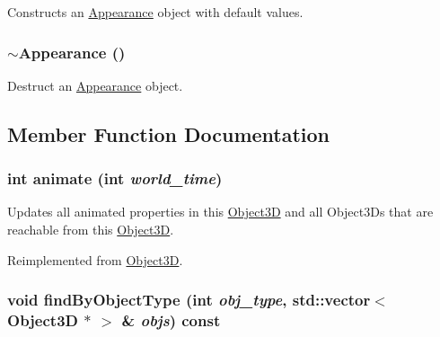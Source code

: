 Constructs an \hyperlink{classm3g_1_1Appearance}{Appearance} object with default values. \hypertarget{classm3g_1_1Appearance_c05c93d7a0f286cb9471b6c667ffeee1}{
\subsubsection[{$\sim$Appearance}]{\setlength{\rightskip}{0pt plus 5cm}$\sim${\bf Appearance} ()}}
\label{classm3g_1_1Appearance_c05c93d7a0f286cb9471b6c667ffeee1}


Destruct an \hyperlink{classm3g_1_1Appearance}{Appearance} object. 

\subsection{Member Function Documentation}
\hypertarget{classm3g_1_1Appearance_8aad1ceab4c2a03609c8a42324ce484d}{
\subsubsection[{animate}]{\setlength{\rightskip}{0pt plus 5cm}int animate (int {\em world\_\-time})}}
\label{classm3g_1_1Appearance_8aad1ceab4c2a03609c8a42324ce484d}


Updates all animated properties in this \hyperlink{classm3g_1_1Object3D}{Object3D} and all Object3Ds that are reachable from this \hyperlink{classm3g_1_1Object3D}{Object3D}. 

Reimplemented from \hyperlink{classm3g_1_1Object3D_8aad1ceab4c2a03609c8a42324ce484d}{Object3D}.\hypertarget{classm3g_1_1Appearance_4dadb21b568b0230fac106f15040138c}{
\subsubsection[{findByObjectType}]{\setlength{\rightskip}{0pt plus 5cm}void findByObjectType (int {\em obj\_\-type}, \/  std::vector$<$ {\bf Object3D} $\ast$ $>$ \& {\em objs}) const}}
\label{classm3g_1_1Appearance_4dadb21b568b0230fac106f15040138c}


